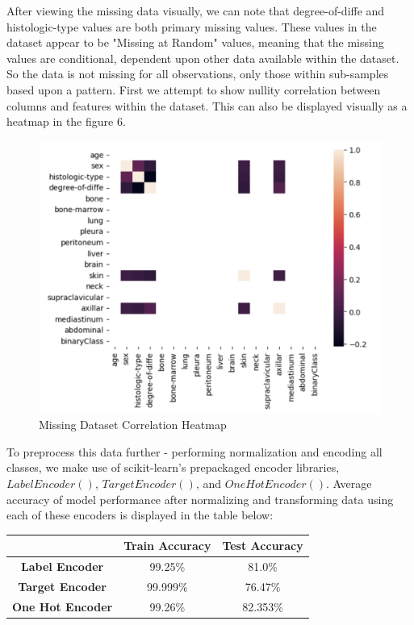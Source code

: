 \documentclass[titlepage]{article}
\begin{document}
\vspace{.5cm}\noindent After viewing the missing data visually, we can note that degree-of-diffe and histologic-type values are both primary missing values.  These values in the dataset appear to be "Missing at Random" values, meaning that the missing values are conditional, dependent upon other data available within the dataset.  So the data is not missing for all observations, only those within sub-samples based upon a pattern.    First we attempt to show nullity correlation between columns and features within the dataset.  This can also be displayed visually as a heatmap in the figure 6.

\begin{figure}
	\centering
	\includegraphics[width=0.65\linewidth]{img/missingheatmap.png}
	\caption{Missing Dataset Correlation Heatmap}
	\label{fig:missingheatmap}
\end{figure}

To preprocess this data further - performing normalization and encoding all classes, we make use of scikit-learn's \cite{scikitlearn} prepackaged encoder libraries, $LabelEncoder()$, $TargetEncoder()$, and $OneHotEncoder()$. Average accuracy of model performance after normalizing and transforming data using each of these encoders is displayed in the table below:  
\begin{center}
\begin{tabular}{ | c | c | c | }
	\hline
	  & \textbf{Train Accuracy} & \textbf{Test Accuracy} \\ 
	  \hline
	\textbf{Label Encoder} & 99.25\% & 81.0\% \\
	 \textbf{Target Encoder} & 99.999\% & 76.47\% \\
	 \textbf{One Hot Encoder} & 99.26\% & 82.353\%  \\
	\hline
\end{tabular}
\end{center}
\end{document}
